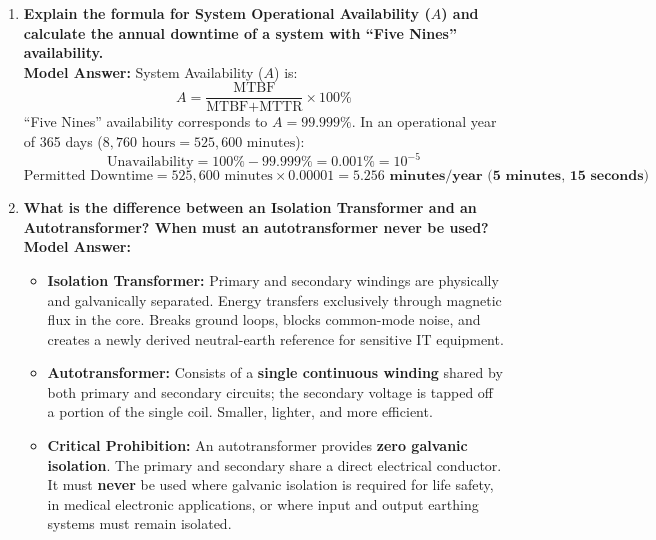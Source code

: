 \begin{enumerate}[leftmargin=*,label=\textbf{Q\arabic*.}]
    \item \textbf{Explain the formula for System Operational Availability ($A$) and calculate the annual downtime of a system with ``Five Nines'' availability.} \\
    \textbf{Model Answer:} System Availability ($A$) is:
    \[
    A = \frac{\text{MTBF}}{\text{MTBF} + \text{MTTR}} \times 100\%
    \]
    ``Five Nines'' availability corresponds to $A = 99.999\%$.
    In an operational year of 365 days ($8,760\text{ hours} = 525,600\text{ minutes}$):
    \[
    \text{Unavailability} = 100\% - 99.999\% = 0.001\% = 10^{-5}
    \]
    \[
    \text{Permitted Downtime} = 525,600\text{ minutes} \times 0.00001 = \mathbf{5.256\text{ minutes/year (5 minutes, 15 seconds)}}
    \]

    \item \textbf{What is the difference between an Isolation Transformer and an Autotransformer? When must an autotransformer never be used?} \\
    \textbf{Model Answer:}
    \begin{itemize}
        \item \textbf{Isolation Transformer:} Primary and secondary windings are physically and galvanically separated. Energy transfers exclusively through magnetic flux in the core. Breaks ground loops, blocks common-mode noise, and creates a newly derived neutral-earth reference for sensitive IT equipment.
        \item \textbf{Autotransformer:} Consists of a \textbf{single continuous winding} shared by both primary and secondary circuits; the secondary voltage is tapped off a portion of the single coil. Smaller, lighter, and more efficient.
        \item \textbf{Critical Prohibition:} An autotransformer provides \textbf{zero galvanic isolation}. The primary and secondary share a direct electrical conductor. It must \textbf{never} be used where galvanic isolation is required for life safety, in medical electronic applications, or where input and output earthing systems must remain isolated.
    \end{itemize}


\end{enumerate}
